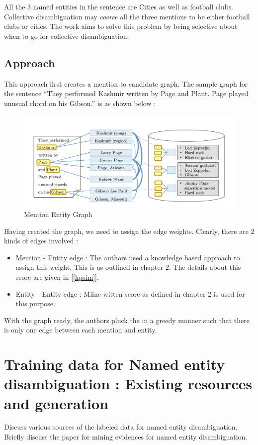 All the 3 named entities in the sentence are Cities as well as football clubs.
Collective disambiguation may \emph{coerce} all the three mentions to be 
either football clubs or cities. The work aims to solve this problem by being selective about when to go for collective disambiguation.

\section{Approach}
This approach first creates a mention to candidate graph. The sample graph for the sentence ``They performed Kashmir 
written by Page and Plant. Page played unusual chord on his Gibson.'' is as shown below : 
 \begin{figure}[H]
 \centering
 \includegraphics[bb=0 0 1074 469,scale=0.3]{./megraph.png}
 \caption{Mention Entity Graph}
\end{figure}


Having created the graph, we need to assign the edge weights. Clearly, there are 2 kinds of edges involved : 
\begin{itemize}
 \item Mention - Entity edge : The authors used a knowledge based approach to assign this weight. This is as outlined in chapter 2.
 The details about this score are given in [\ref{kpsim}].
 \item Entity - Entity edge : Milne witten score as defined in chapter 2 is used for this purpose.
\end{itemize}

With the graph ready, the authors pluck the in a greedy manner such that there is only one edge between each 
mention and entity.

\chapter{Training data for Named entity disambiguation : Existing resources and generation}
Discuss various sources of the labeled data for named entity disambiguation. 
Briefly discuss the paper for mining evidences for named entity disambiguation.
